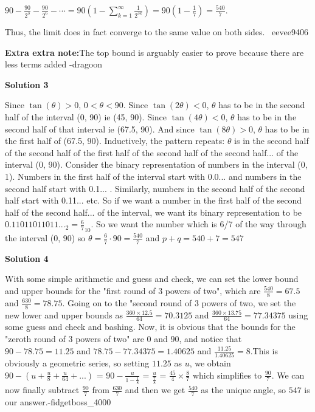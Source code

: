 \begin{enumerate}
 $90-\frac{90}{2^3}-\frac{90}{2^6}-\cdots=90\left(1-\sum_{k=1}^{\infty}\frac{1}{2^{3k}}\right)=90\left(1-\frac{1}{7}\right)=\frac{540}{7}$.

 Thus, the limit does in fact converge to the same value on both sides. ~eevee9406

 \textbf{Extra extra note:}The top bound is arguably easier to prove because there are less terms added -dragoon

 



\textbf{Solution 3}

Since $\tan\left(\theta\right) > 0$, $0 < \theta < 90$.  Since $\tan\left(2\theta\right) < 0$, $\theta$ has to be in the second half of the interval (0, 90) ie (45, 90).  Since $\tan\left(4\theta\right) < 0$, $\theta$ has to be in the second half of that interval ie (67.5, 90).  And since $\tan\left(8\theta\right) > 0$, $\theta$ has to be in the first half of (67.5, 90).  Inductively, the pattern repeats: $\theta$ is in the second half of the second half of the first half of the second half of the second half... of the interval (0, 90).  Consider the binary representation of numbers in the interval (0, 1).  Numbers in the first half of the interval start with 0.0... and numbers in the second half start with 0.1... .  Similarly, numbers in the second half of the second half start with 0.11... etc.  So if we want a number in the first half of the second half of the second half... of the interval, we want its binary representation to be $0.11011011011..._2 = \frac{6}{7}_{10}$.  So we want the number which is 6/7 of the way through the interval (0, 90) so $\theta = \frac{6}{7}\cdot 90 = \frac{540}{7}$ and $p+q = 540 + 7 = \boxed{547}$




\textbf{Solution 4}

With some simple arithmetic and guess and check, we can set the lower bound and upper bounds for the "first round of $3$ powers of two", which are $\frac{540}{8} = 67.5$ and $\frac{630}{8} = 78.75$. Going on to the "second round of $3$ powers of two, we set the new lower and upper bounds as $\frac{360 \times 12.5}{64} = 70.3125$ and $\frac{360 \times 13.75}{64} = 77.34375$ using some guess and check and bashing. Now, it is obvious that the bounds for the "zeroth round of $3$ powers of two" are $0$ and $90$, and notice that $90 - 78.75 = 11.25$ and $78.75 - 77.34375 = 1.40625$ and $\frac{11.25}{1.40625} = 8$.This is obviously a geometric series, so setting $11.25$ as $u$, we obtain $90 - (u + \frac{u}{8} + \frac{u}{64} + ...)$ = $90 - \frac{u}{1-\frac{1}{8}}$ = $\frac{u}{\frac{7}{8}}$ = $\frac{45}{4} \times \frac{8}{7}$ which simplifies to $\frac{90}{7}$. We can now finally subtract $\frac{90}{7}$ from $\frac{630}{7}$ and then we get $\frac{540}{7}$ as the unique angle, so $\boxed{547}$ is our answer.-fidgetboss\_4000


\end{enumerate}
